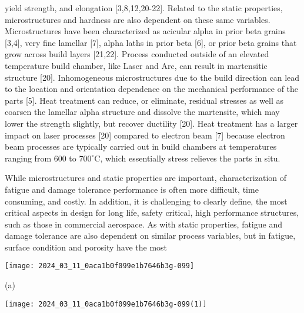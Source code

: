 \documentclass[10pt]{article}
\begin{document}
yield strength, and elongation [3,8,12,20-22]. Related to the static properties, microstructures and hardness are also dependent on these same variables. Microstructures have been characterized as acicular alpha in prior beta grains [3,4], very fine lamellar [7], alpha laths in prior beta [6], or prior beta grains that grow across build layers [21,22]. Process conducted outside of an elevated temperature build chamber, like Laser and Arc, can result in martensitic structure [20]. Inhomogeneous microstructures due to the build direction can lead to the location and orientation dependence on the mechanical performance of the parts [5]. Heat treatment can reduce, or eliminate, residual stresses as well as coarsen the lamellar alpha structure and dissolve the martensite, which may lower the strength slightly, but recover ductility [20]. Heat treatment has a larger impact on laser processes [20] compared to electron beam [7] because electron beam processes are typically carried out in build chambers at temperatures ranging from 600 to $700^{\circ} \mathrm{C}$, which essentially stress relieves the parts in situ.

While microstructures and static properties are important, characterization of fatigue and damage tolerance performance is often more difficult, time consuming, and costly. In addition, it is challenging to clearly define, the most critical aspects in design for long life, safety critical, high performance structures, such as those in commercial aerospace. As with static properties, fatigue and damage tolerance are also dependent on similar process variables, but in fatigue, surface condition and porosity have the most

\begin{center}
\texttt{[image: 2024\_03\_11\_0aca1b0f099e1b7646b3g-099]}
\end{center}

(a)

\begin{center}
\texttt{[image: 2024\_03\_11\_0aca1b0f099e1b7646b3g-099(1)]}
\end{center}
\end{document}

